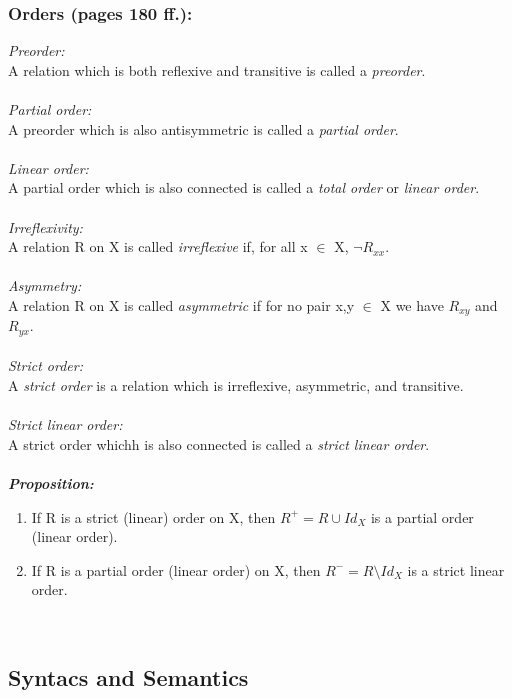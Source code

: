 \documentclass{report}
\begin{document}
 	\subsubsection{Orders (pages 180 ff.):}
 	\textit{Preorder:} \\
 	A relation which is both reflexive and transitive is called a \textit{preorder}. \\
 	\\
 	\textit{Partial order:} \\
 	A preorder which is also antisymmetric is called a \textit{partial order}. \\
 	\\
 	\textit{Linear order:} \\
 	A partial order which is also connected is called a \textit{total order} or \textit{linear order}. \\
 	\\
 	\textit{Irreflexivity:} \\
 	A relation R on X is called \textit{irreflexive} if, for all x $\in$ X, $\neg R_{xx}$. \\
 	\\
 	\textit{Asymmetry:} \\
 	A relation R on X is called \textit{asymmetric} if for no pair x,y $\in$ X we have $R_{xy}$ and $R_{yx}$. \\
 	\\
 	\textit{Strict order:} \\
 	A \textit{strict order} is a relation which is irreflexive, asymmetric, and transitive. \\
 	\\
 	\textit{Strict linear order:} \\
 	A strict order whichh is also connected is called a \textit{strict linear order}. \\
 	\\
 	\textbf{\textit{Proposition:}}
 	\begin{enumerate}
 		\item If R is a strict (linear) order on X, then $R^+ = R \cup Id_X$ is a partial order (linear order).
 		\item If R is a partial order (linear order) on X, then $R^- = R \setminus Id_X$ is a strict linear order.
 	\end{enumerate}
 	\hfill \\
 	
 	\subsection{Syntacs and Semantics}
\end{document}
